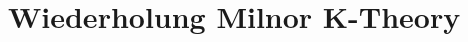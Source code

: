 \documentclass[ngerman,fontsize=11pt, paper=a4, parskip=half, titlepage=true, toc=bib]{scrartcl}
\begin{document}
\maketitle
\tableofcontents




\section{Wiederholung Milnor K-Theory}

\Blindtext


\printindex

\printbibliography
\end{document}
